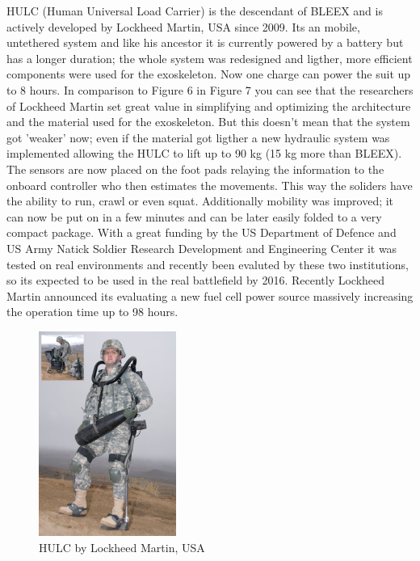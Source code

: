 \documentclass[letterpaper, 10 pt, conference]{ieeeconf}  %
\begin{document}

HULC (Human Universal Load Carrier) is the descendant of BLEEX and is actively developed by Lockheed Martin, USA since 2009. Its an mobile, untethered system and like his ancestor it is currently powered by a battery but has a longer duration; the whole system was redesigned and ligther, more efficient components were used for the exoskeleton. Now one charge can power the suit up to 8 hours. In comparison to Figure 6 in Figure 7 you can see that the researchers of Lockheed Martin set great value in simplifying and optimizing the architecture and the material used for the exoskeleton. But this doesn't mean that the system got 'weaker' now; even if the material got ligther a new hydraulic system was implemented allowing the HULC to lift up to 90 kg (15 kg more than BLEEX). The sensors are now placed on the foot pads relaying the information to the onboard controller who then estimates the movements. This way the soliders have the ability to run, crawl or even squat. Additionally mobility was improved; it can now be put on in a few minutes and can be later easily folded to a very compact package. With a great funding by the US Department of Defence and US Army Natick Soldier Research Development and Engineering Center it was tested on real environments and recently been evaluted by these two institutions, so its expected to be used in the real battlefield by 2016. Recently Lockheed Martin announced its evaluating a new fuel cell power source massively increasing the operation time up to 98 hours.\newpage


\begin{figure}[H]
  \centering
    \includegraphics[width=0.4\textwidth]{img/hulc}
  \caption{HULC by Lockheed Martin, USA}
\end{figure}
\end{document}
